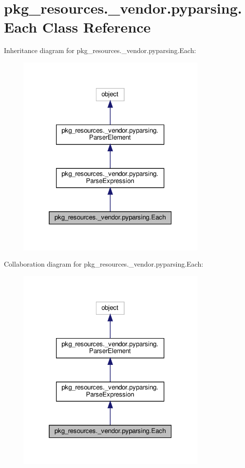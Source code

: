 \hypertarget{classpkg__resources_1_1__vendor_1_1pyparsing_1_1Each}{}\section{pkg\+\_\+resources.\+\_\+vendor.\+pyparsing.\+Each Class Reference}
\label{classpkg__resources_1_1__vendor_1_1pyparsing_1_1Each}


Inheritance diagram for pkg\+\_\+resources.\+\_\+vendor.\+pyparsing.\+Each\+:
\nopagebreak
\begin{figure}[H]
\begin{center}
\leavevmode
\includegraphics[width=268pt]{classpkg__resources_1_1__vendor_1_1pyparsing_1_1Each__inherit__graph}
\end{center}
\end{figure}


Collaboration diagram for pkg\+\_\+resources.\+\_\+vendor.\+pyparsing.\+Each\+:
\nopagebreak
\begin{figure}[H]
\begin{center}
\leavevmode
\includegraphics[width=268pt]{classpkg__resources_1_1__vendor_1_1pyparsing_1_1Each__coll__graph}
\end{center}
\end{figure}
